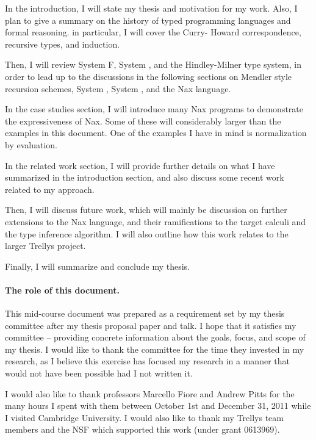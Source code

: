 In the introduction, I will state my thesis and motivation for my work.
Also, I plan to give a summary on the history of typed programming
languages and formal reasoning. in particular, I will cover the Curry-
Howard correspondence, recursive types, and induction.

Then, I will review System \textsf{F}, System \Fw, and the Hindley-Milner
type system, in order to lead up to the discussions in the following
sections on Mendler style recursion schemes, System \Fi, System \Fixi, and
the Nax language.

In the case studies section, I will introduce many Nax programs to
demonstrate the expressiveness of Nax. Some of these will considerably
larger than the examples in this document. One of the examples I have in
mind is normalization by evaluation.

In the related work section, I will provide further details on what I have
summarized in the introduction section, and also discuss some recent work
related to my approach.

Then, I will discuss future work, which will mainly be discussion on further
extensions to the Nax language, and their ramifications to
the target calculi and the type inference algorithm. I will also
outline how this work relates to the larger Trellys project.

Finally, I will summarize and conclude my thesis.

\paragraph{The role of this document.} This mid-course document
was prepared as a requirement set by my thesis committee after
my thesis proposal paper and talk. I hope that it satisfies my
committee -- providing concrete
information about the goals, focus, and scope of my thesis. I would like
to thank the committee for the time they invested in my research, as I believe this
exercise
has focused my research in a manner that would not have been possible had
I not written it.

I would also like to thank professors Marcello Fiore and Andrew Pitts for
the many hours I spent with them between October 1st and December 31, 2011
while I visited Cambridge University. I would also like to thank my Trellys
team members and the NSF which supported this work (under grant 0613969).

